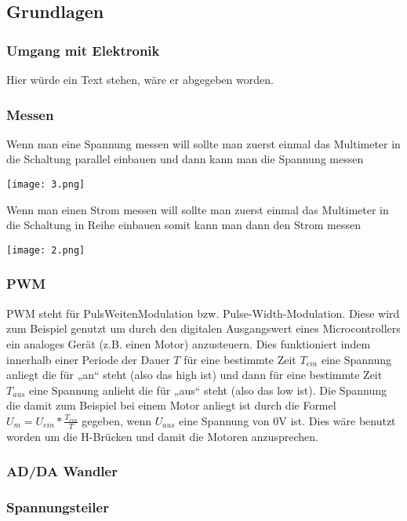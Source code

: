 \documentclass[notitlepage]{report}
\begin{document}
\subsection{Grundlagen}

\subsubsection{Umgang mit Elektronik}

Hier w\"{u}rde ein Text stehen, w\"{a}re er abgegeben worden.

\subsubsection{Messen}

Wenn man eine Spannung messen will sollte man zuerst einmal das Multimeter in die Schaltung parallel einbauen und dann kann man die Spannung messen

\texttt{[image: 3.png]}

Wenn man einen Strom messen will sollte man zuerst einmal das Multimeter in die Schaltung in Reihe einbauen somit kann man dann den Strom messen

\texttt{[image: 2.png]}

\subsubsection{PWM}

PWM steht f\"{u}r PulsWeitenModulation bzw. Pulse-Width-Modulation. Diese wird zum Beispiel genutzt um durch den digitalen Ausgangswert eines Microcontrollers ein analoges Ger\"{a}t (z.B. einen Motor) anzusteuern. Dies funktioniert indem innerhalb einer Periode der Dauer $T$ f\"{u}r eine bestimmte Zeit $T_{ein}$ eine Spannung anliegt die f\"{u}r „an“ steht (also das high ist) und dann f\"{u}r eine bestimmte Zeit $T_{aus}$ eine Spannung anlieht die f\"{u}r „aus“ steht (also das low ist). Die Spannung die damit zum Beispiel bei einem Motor anliegt ist durch die Formel $U_m = U_{ein} * \frac{T_{ein}}{T}$ gegeben, wenn $U_{aus}$ eine Spannung von 0V ist. Dies w\"{a}re benutzt worden um die H-Br\"{u}cken und damit die Motoren anzusprechen.

\subsubsection{AD/DA Wandler}

\subsubsection{Spannungsteiler}
\end{document}
